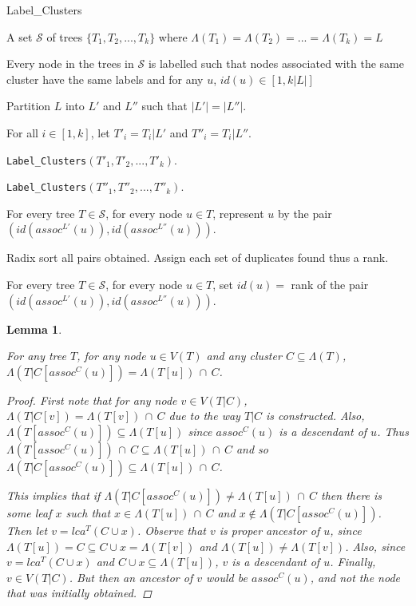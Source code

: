 \documentclass{article}
\newcommand{\leafset}{\Lambda}
\newtheorem{assocnode}[incompatibility]{Lemma}
\begin{document}
    \begin{algorithm}
        \caption{Label\_Clusters}
        \label{alg:labelclusters}

        \begin{algorithmic}[1]
            \Input A set $\mathcal{S}$ of trees $\{T_1, T_2, ..., T_k\}$ where $\leafset(T_1) = \leafset(T_2) = ... = \leafset(T_k) = L$

            \Output Every node in the trees in $\mathcal{S}$ is labelled such that nodes associated with the same cluster have the same labels and for any $u$, $id(u) \in [1, k |L|]$

            \State Partition $L$ into $L'$ and $L''$ such that $|L'| = |L''|$.

            \State For all $i \in [1,k]$, let $T'_i = T_i|L'$ and $T''_i = T_i|L''$.

            \State \texttt{Label\_Clusters}$(T'_1, T'_2, ..., T'_k)$.

            \State \texttt{Label\_Clusters}$(T''_1, T''_2, ..., T''_k)$.

            \State For every tree $T \in \mathcal{S}$, for every node $u \in T$, represent $u$ by the pair $(id(assoc^{L'}(u)), id(assoc^{L''}(u)))$.

            \State Radix sort all pairs obtained. Assign each set of duplicates found thus a rank.

            \State For every tree $T \in \mathcal{S}$, for every node $u \in T$, set $id(u) = $ rank of the pair $(id(assoc^{L'}(u)), id(assoc^{L''}(u)))$.
        \end{algorithmic}
    \end{algorithm}

    \bigskip
    \begin{assocnode}
        \label{lem:assocnode}

        For any tree $T$, for any node $u \in V(T)$ and any cluster $C \subseteq \leafset(T)$, $\leafset(T|C[assoc^C(u)]) = \leafset(T[u])\, \cap\, C$.

        \begin{proof}
            First note that for any node $v \in V(T|C)$, $\leafset(T|C[v]) = \leafset(T[v])\, \cap\, C$ due to the way $T|C$ is constructed. Also, $\leafset(T[assoc^C(u)]) \subseteq \leafset(T[u])$ since $assoc^C(u)$ is a descendant of $u$. Thus $\leafset(T[assoc^C(u)])\, \cap\, C \subseteq \leafset(T[u])\, \cap\, C$ and so $\leafset(T|C[assoc^C(u)]) \subseteq \leafset(T[u])\, \cap\, C$.

            This implies that if $\leafset(T|C[assoc^C(u)]) \neq \leafset(T[u])\, \cap\, C$ then there is some leaf $x$ such that $x \in \leafset(T[u])\, \cap\, C$ and $x \not\in \leafset(T|C[assoc^C(u)])$. Then let $v = lca^T(C \cup x)$. Observe that $v$ is proper ancestor of $u$, since $\leafset(T[u]) = C \subseteq C \cup x = \leafset(T[v])$ and $\leafset(T[u]) \neq \leafset(T[v])$. Also, since $v = lca^T(C \cup x)$ and $C \cup x \subseteq \leafset(T[u])$, $v$ is a descendant of $u$. Finally, $v \in V(T|C)$. But then an ancestor of $v$ would be $assoc^C(u)$, and not the node that was initially obtained.
        \end{proof}
    \end{assocnode}
\end{document}
